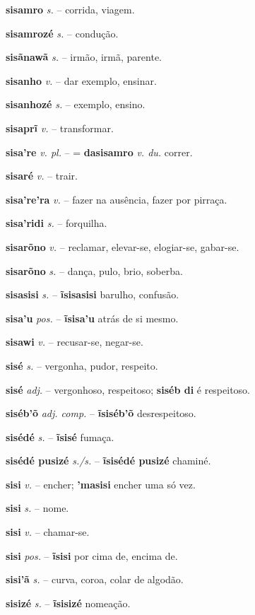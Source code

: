 \textbf{sisamro} \textit{s.} -- corrida, viagem.

\textbf{sisamrozé} \textit{s.} -- condução.

\textbf{sisãnawã} \textit{s.} -- irmão, irmã, parente.

\textbf{sisanho} \textit{v.} -- dar exemplo, ensinar.

\textbf{sisanhozé} \textit{s.} -- exemplo, ensino.

\textbf{sisaprĩ} \textit{v.} -- transformar.

\textbf{sisa're} \textit{v. pl.} -- = \textbf{dasisamro} \textit{v. du.} correr.

\textbf{sisaré} \textit{v.} -- trair.

\textbf{sisa're'ra} \textit{v.} -- fazer na ausência, fazer por pirraça.

\textbf{sisa'ridi} \textit{s.} -- forquilha.

\textbf{sisarõno} \textit{v.} -- reclamar, elevar-se, elogiar-se, gabar-se.

\textbf{sisarõno} \textit{s.} -- dança, pulo, brio, soberba.

\textbf{sisasisi} \textit{s.} -- \textbf{ĩsisasisi} barulho, confusão.

\textbf{sisa'u} \textit{pos.} -- \textbf{ĩsisa'u} atrás de si mesmo.

\textbf{sisawi} \textit{v.} -- recusar-se, negar-se.

\textbf{sisé} \textit{s.} -- vergonha, pudor, respeito.

\textbf{sisé} \textit{adj.} -- vergonhoso, respeitoso; \textbf{siséb di} é respeitoso.

\textbf{siséb'õ} \textit{adj. comp.} -- \textbf{ĩsiséb'õ} desrespeitoso.

\textbf{sisédé} \textit{s.} -- \textbf{ĩsisé} fumaça.

\textbf{sisédé pusizé} \textit{s./s.} -- \textbf{ĩsisédé pusizé} chaminé.

\textbf{sisi} \textit{v.} -- encher; \textbf{'masisi} encher uma só vez.

\textbf{sisi} \textit{s.} -- nome.

\textbf{sisi} \textit{v.} -- chamar-se.

\textbf{sisi} \textit{pos.} -- \textbf{ĩsisi} por cima de, encima de.

\textbf{sisi'ã} \textit{s.} -- curva, coroa, colar de algodão.

\textbf{sisizé} \textit{s.} -- \textbf{ĩsisizé} nomeação.

